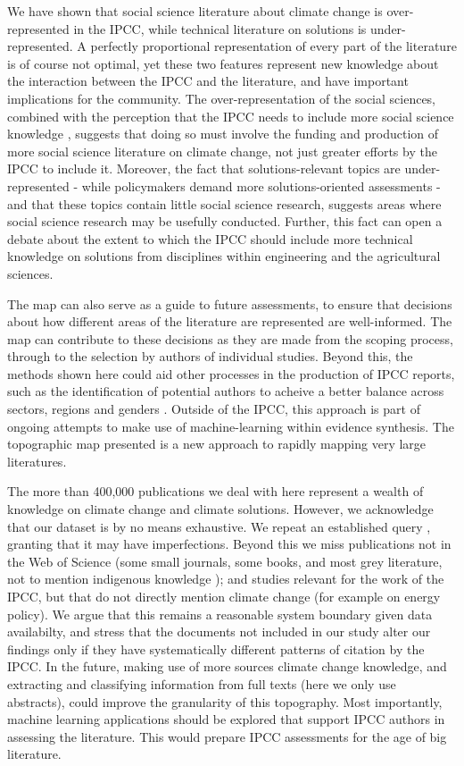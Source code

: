 \documentclass{article}
\begin{document}
\begin{linenumbers}
		
		We have shown that social science literature about climate change is over-represented in the IPCC, while technical literature on solutions is under-represented.
		A perfectly proportional representation of every part of the literature is of course not optimal, yet these two features represent new knowledge about the interaction between the IPCC and the literature, and have important implications for the community. 
		The over-representation of the social sciences, combined with the perception that the IPCC needs to include more social science knowledge \cite{Victor2015}, suggests that doing so must involve the funding and production of more social science literature on climate change, not just greater efforts by the IPCC to include it. 
		Moreover, the fact that solutions-relevant topics are under-represented - while policymakers demand more solutions-oriented assessments - and that these topics contain little social science research, suggests areas where social science research may be usefully conducted. Further, this fact can open a debate about the extent to which the IPCC should include more technical knowledge on solutions from disciplines within engineering and the agricultural sciences.
		
		
		The map can also serve as a guide to future assessments, to ensure that decisions about how different areas of the literature are represented are well-informed. 
		The map can contribute to these decisions as they are made from the scoping process, through to the selection by authors of individual studies.
		Beyond this, the methods shown here could aid other processes in the production of IPCC reports, such as the identification of potential authors to acheive a better balance across sectors, regions and genders \cite{Corbera2016}.
		Outside of the IPCC, this approach is part of ongoing attempts to make use of machine-learning within evidence synthesis. The topographic map presented is a new approach to rapidly mapping very large literatures. 
		
		The more than 400,000 publications we deal with here represent a wealth of knowledge on climate change and climate solutions. However, we acknowledge that our dataset is by no means exhaustive. We repeat an established query \cite{Haunschild2016}, granting that it may have imperfections. Beyond this we miss publications not in the Web of Science (some small journals, some books, and most grey literature, not to mention indigenous knowledge \cite{Ford2016b}); and studies relevant for the work of the IPCC, but that do not directly mention climate change (for example on energy policy). We argue that this remains a reasonable system boundary given data availabilty, and stress that the documents not included in our study alter our findings only if they have systematically different patterns of citation by the IPCC. In the future, making use of more sources climate change knowledge, and extracting and classifying information from full texts (here we only use abstracts), could improve the granularity of this topography. Most importantly, machine learning applications should be explored that support IPCC authors in assessing the literature. This would prepare IPCC assessments for the age of big literature.
		

\end{linenumbers}
\end{document}
